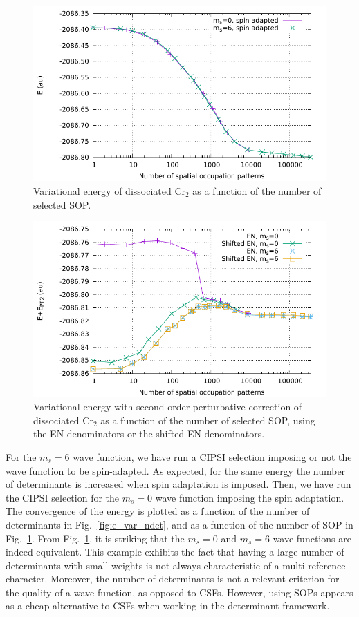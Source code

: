 \documentclass[aip,jcp,reprint,showkeys]{revtex4-1}
\newcommand{\sop}{SOP}
\newcommand{\cipsi}{CIPSI}
\newcommand{\csf}{CSF}
\begin{document}
\begin{figure}
\includegraphics[width=0.9\columnwidth]{e_var_nsop}
\caption{Variational energy of dissociated Cr$_2$ as a function of the number of
selected \sop{}.}
\label{fig:e_var_nsop}
\end{figure}

\begin{figure}
\includegraphics[width=0.9\columnwidth]{e_pt2_nsop}
\caption{Variational energy with second order perturbative correction of
dissociated Cr$_2$ as a function of the number of selected \sop{}, using
the EN denominators or the shifted EN denominators.}
\label{fig:e_pt2_nsop}
\end{figure}

For the $m_s=6$ wave function, we have run a \cipsi{} selection imposing or not the
wave function to be spin-adapted. As expected, for the same energy the number of
determinants is increased when spin adaptation is imposed. Then, we have run the
\cipsi{} selection for the $m_s=0$ wave function imposing the
spin adaptation. The convergence of the energy is plotted as a function of the
number of determinants in Fig.~\ref{fig:e_var_ndet}, and as a function of
the number of \sop{} in Fig.~\ref{fig:e_var_nsop}.
From Fig.~\ref{fig:e_var_nsop}, it is striking that the $m_s=0$ and $m_s=6$
wave functions are indeed equivalent.
This example exhibits the fact that having a large number of determinants with
small weights is not always characteristic of a multi-reference character.
Moreover, the number of determinants is not a relevant criterion for the
quality of a wave function, as opposed to \csf s. However, using \sop s
appears as a cheap alternative to \csf s when working in the determinant
framework.
\end{document}
